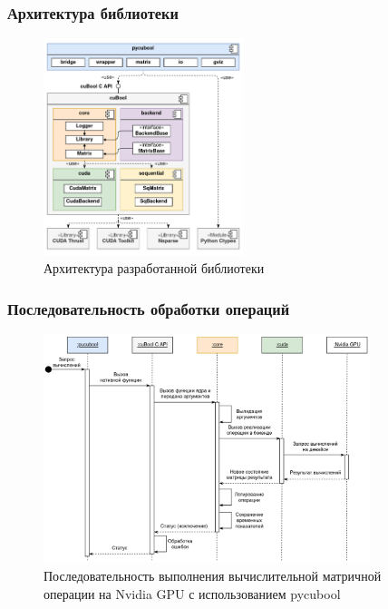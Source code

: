 \documentclass[xcolor=table,english]{beamer}
\begin{document}
\begin{frame}[fragile] \frametitle{Архитектура библиотеки}
    \begin{center}
    \begin{minipage}[m]{\linewidth}
        \begin{figure}
            \centering
            \includegraphics[width=0.52\textwidth]{figures/library_architecture.png}
            \caption{Архитектура разработанной библиотеки}
        \end{figure}
    \end{minipage}\hfill    
    \end{center}
\end{frame}

\begin{frame}[fragile] \frametitle{Последовательность обработки операций}
    \begin{center}
    \begin{minipage}[m]{0.85\linewidth}
        \begin{figure}
            \centering
            \includegraphics[width=0.85\textwidth]{figures/library_call_flow.png}
            \caption{Последовательность выполнения вычислительной матричной операции на Nvidia GPU с использованием pycubool}
        \end{figure}
    \end{minipage}\hfill    
    \end{center}
\end{frame}
\end{document}
